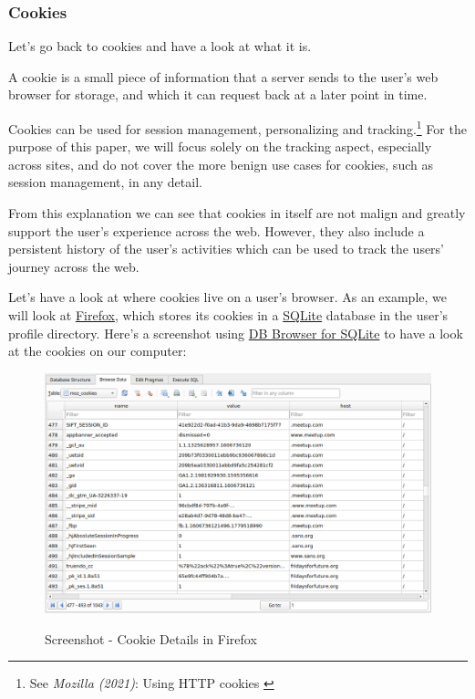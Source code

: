 \subsubsection{Cookies}

Let's go back to cookies and have a look at what it is.

A cookie is a small piece of information that a server sends to the user's web browser for storage, and which it can request back at a later point in time.

Cookies can be used for session management, personalizing and tracking.\footnote{See \textit{Mozilla (2021)}: Using HTTP cookies \cite{usingCookies}} For the purpose of this paper, we will focus solely on the tracking aspect, especially across sites, and do not cover the more benign use cases for cookies, such as session management, in any detail.

From this explanation we can see that cookies in itself are not malign and greatly support the user's experience across the web. However, they also include a persistent history of the user's activities which can be used to track the users' journey across the web.

Let's have a look at where cookies live on a user's browser. As an example, we will look at \href{https://www.mozilla.org/en-US/firefox/new/}{Firefox}, which stores its cookies in a \href{https://www.sqlite.org/index.html}{SQLite} database in the user's profile directory. Here's a screenshot using \href{https://sqlitebrowser.org/}{DB Browser for SQLite} to have a look at the cookies on our computer:

\begin{figure}[H]
\centering
\caption{Screenshot - Cookie Details in Firefox}
\includegraphics[width=\linewidth]{images/cookie-sqlite.png}
\label{fig:cookies}
\end{figure}

